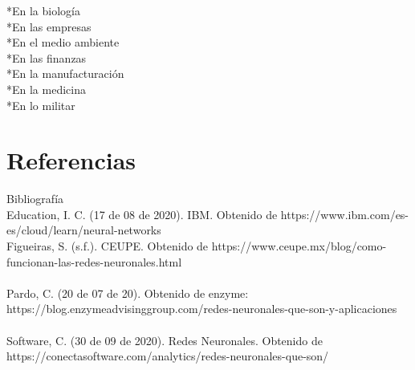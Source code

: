 \documentclass[letterpaper,12pt]{article}
\begin{document}
    *En la biología\\
    *En las empresas\\
    *En el medio ambiente\\
    *En las finanzas\\
    *En la manufacturación\\
    *En la medicina\\
    *En lo militar

\section{Referencias}

Bibliografía\\

Education, I. C. (17 de 08 de 2020). IBM. Obtenido de https://www.ibm.com/es-es/cloud/learn/neural-networks\\
Figueiras, S. (s.f.). CEUPE. Obtenido de https://www.ceupe.mx/blog/como-funcionan-las-redes-neuronales.html\\\\
Pardo, C. (20 de 07 de 20). Obtenido de enzyme: https://blog.enzymeadvisinggroup.com/redes-neuronales-que-son-y-aplicaciones\\\\
Software, C. (30 de 09 de 2020). Redes Neuronales. Obtenido de https://conectasoftware.com/analytics/redes-neuronales-que-son/
\end{document}
